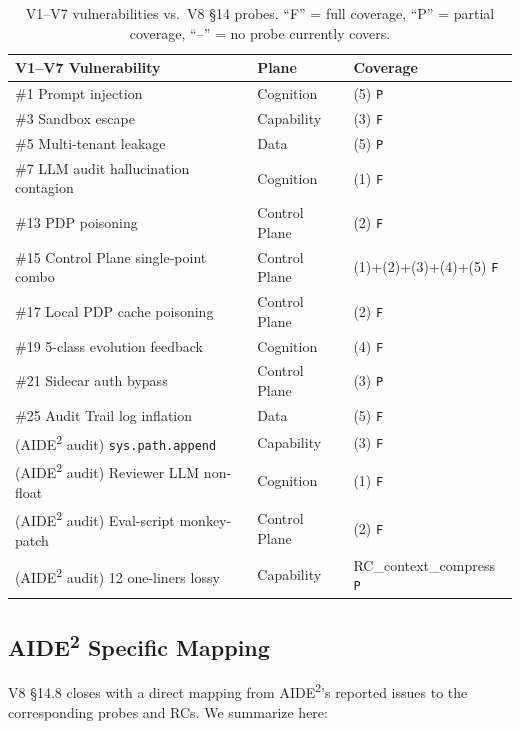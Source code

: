 \begin{table}[h]
\centering
\caption{V1--V7 vulnerabilities vs.\ V8 \S14 probes. ``F'' = full coverage, ``P'' = partial coverage, ``--'' = no probe currently covers.}
\label{tab:threat-coverage}
\begin{tabular}{lll}
\toprule
V1--V7 Vulnerability & Plane & Coverage \\
\midrule
\#1 Prompt injection & Cognition & (5) \texttt{P} \\
\#3 Sandbox escape & Capability & (3) \texttt{F} \\
\#5 Multi-tenant leakage & Data & (5) \texttt{P} \\
\#7 LLM audit hallucination contagion & Cognition & (1) \texttt{F} \\
\#13 PDP poisoning & Control Plane & (2) \texttt{F} \\
\#15 Control Plane single-point combo & Control Plane & (1)+(2)+(3)+(4)+(5) \texttt{F} \\
\#17 Local PDP cache poisoning & Control Plane & (2) \texttt{F} \\
\#19 5-class evolution feedback & Cognition & (4) \texttt{F} \\
\#21 Sidecar auth bypass & Control Plane & (3) \texttt{P} \\
\#25 Audit Trail log inflation & Data & (5) \texttt{F} \\
(AIDE\textsuperscript{2} audit) \texttt{sys.path.append} & Capability & (3) \texttt{F} \\
(AIDE\textsuperscript{2} audit) Reviewer LLM non-float & Cognition & (1) \texttt{F} \\
(AIDE\textsuperscript{2} audit) Eval-script monkey-patch & Control Plane & (2) \texttt{F} \\
(AIDE\textsuperscript{2} audit) 12 one-liners lossy & Capability & RC\_context\_compress \texttt{P} \\
\bottomrule
\end{tabular}
\end{table}

\subsection{AIDE\textsuperscript{2} Specific Mapping}

V8 \S14.8 closes with a direct mapping from AIDE\textsuperscript{2}'s reported issues to the corresponding probes and RCs. We summarize here:

